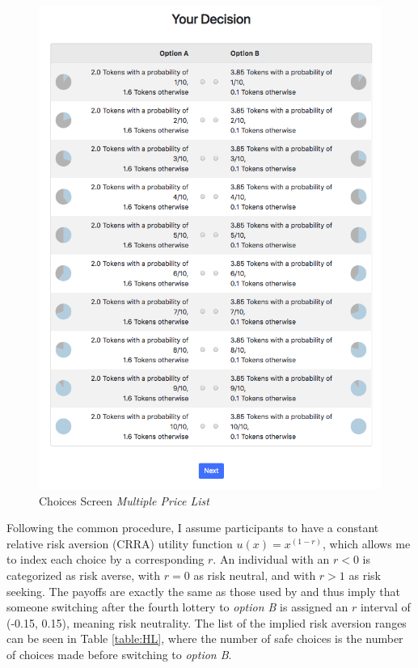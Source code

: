      \begin{figure}
         \centering
         \includegraphics[scale=0.4]{graphs/Choices_MPL.png}
         \caption{Choices Screen \textit{Multiple Price List}}
         \label{fig:choices_mpl}
     \end{figure}
     
     
    Following the common procedure, I assume participants to have a constant relative risk aversion (CRRA) utility function $u(x)=x^{(1-r)}$, which allows me to index each choice by a corresponding $r$. An individual with an $r<0$ is categorized as risk averse, with $r=0$ as risk neutral, and with $r>1$ as risk seeking. The payoffs are exactly the same as those used by \cite{holt2002} and thus imply that someone switching after the fourth lottery to \textit{option B} is assigned an $r$ interval of (-0.15, 0.15), meaning risk neutrality. The list of the implied risk aversion ranges can be seen in Table \ref{table:HL}, where the number of safe choices is the number of choices made before switching to \textit{option B}.
    

